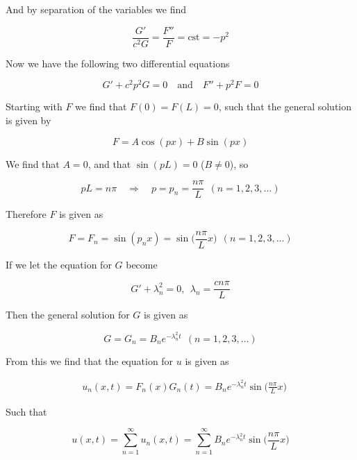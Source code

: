 \documentclass[a4paper]{article}
\begin{document}
And by separation of the variables we find

\begin{equation*}
    \frac{G'}{c^2G}=\frac{F''}{F}=\text{cst}=-p^2
\end{equation*}

Now we have the following two differential equations 

\begin{equation*}
    G'+c^2p^2G=0\quad\text{and}\quad F''+p^2F=0
\end{equation*}

Starting with $F$ we find that $F(0)=F(L)=0$, such that the general solution is given by

\begin{equation*}
    F=A\cos(px)+B\sin(px)
\end{equation*}

We find that $A=0$, and that $\sin(pL)=0$ ($B\not=0$), so

\begin{equation*}
    pL=n\pi\quad\Rightarrow\quad p=p_n=\frac{n\pi}{L}\ \ (n=1, 2, 3, ...)
\end{equation*}

Therefore $F$ is given as

\begin{equation*}
    F=F_n=\sin(p_nx)=\sin\bigg(\frac{n\pi}{L}x\bigg)\ \ (n=1, 2, 3, ...)
\end{equation*}

If we let the equation for $G$ become

\begin{equation*}
    G'+\lambda_n^2=0,\ \ \lambda_n=\frac{cn\pi}{L} 
\end{equation*}

Then the general solution for $G$ is given as

\begin{equation*}
    G=G_n=B_ne^{-\lambda_n^2t}\ \ (n=1, 2, 3, ...)
\end{equation*}

From this we find that the equation for $u$ is given as

\begin{align*}
    &u_n(x, t)=F_n(x)G_n(t)=B_ne^{-\lambda_n^2t}\sin\bigg(\frac{n\pi}{L}x\bigg)
\end{align*}

Such that 

\begin{equation*}
    u(x, t)=\sum_{n=1}^{\infty}u_n(x,t)=\sum_{n=1}^{\infty}B_ne^{-\lambda_n^2t}\sin\bigg(\frac{n\pi}{L}x\bigg)
\end{equation*}
\end{document}

